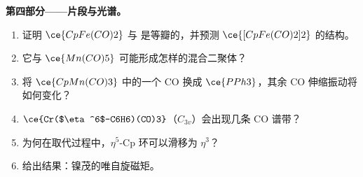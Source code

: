 \begin{problem}
\medskip\noindent\textbf{第四部分——片段与光谱。}
\begin{enumerate}[resume]
  \item 证明 $\ce{CpFe(CO)2}$ 与  是等瓣的，并预测
        $\ce{[CpFe(CO)2]2}$ 的结构。
  \item 它与 $\ce{Mn(CO)5}$ 可能形成怎样的混合二聚体？
  \item 将 $\ce{CpMn(CO)3}$ 中的一个 CO 换成 $\ce{PPh3}$，其余
        CO 伸缩振动将如何变化？
  \item $\ce{Cr($\eta^6$-C6H6)(CO)3}$（$C_{3v}$）会出现几条 CO 谱带？
  \item 为何在取代过程中，$\eta^5$-Cp 环可以滑移为 $\eta^3$？
  \item 给出结果：镍茂的唯自旋磁矩。
\end{enumerate}
\end{problem}
